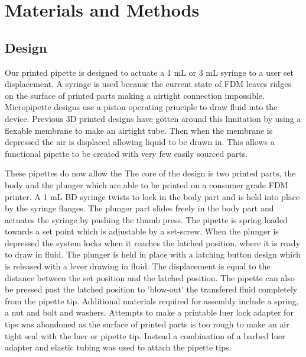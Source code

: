 \documentclass[10pt,letterpaper]{article}
\begin{document}

\section*{Materials and Methods}
\subsection*{Design}

Our printed pipette is designed to actuate a 1 mL or 3 mL syringe to a user set displacement.
A syringe is used because the current state of FDM leaves ridges on the surface of printed parts making a airtight connection impossible. 
Micropipette designs use a piston operating principle to draw fluid into the device.
Previous 3D printed designs have gotten around this limitation by using a flexable membrane to make an airtight tube.
Then when the membrane is depressed the air is displaced allowing liquid to be drawn in.
This allows a functional pipette to be created with very few easily sourced parts.

These pipettes do now allow the 
The core of the design is two printed parts, the body and the plunger which are able to be printed on a consumer grade FDM printer.
A 1 mL BD syringe twists to lock in the body part and is held into place by the syringe flanges.
The plunger part slides freely in the body part and actuates the syringe by pushing the thumb press. 
The pipette is spring loaded towards a set point which is adjustable by a set-screw. 
When the plunger is depressed the system locks when it reaches the latched position, where it is ready to draw in fluid.
The plunger is held in place with a latching button design which is released with a lever drawing in fluid.
The displacement is equal to the distance between the set position and the latched position.
The pipette can also be pressed past the latched position to 'blow-out' the transfered fluid completely from the pipette tip.   
Additional materials required for assembly include a spring, a nut and bolt and washers.
Attempts to make a printable luer lock adapter for tips was abandoned as the surface of printed parts is too rough to make an air tight seal with the luer or pipette tip.
Instead a combination of a barbed luer adapter and elastic tubing was used to attach the pipette tips.
\end{document}
